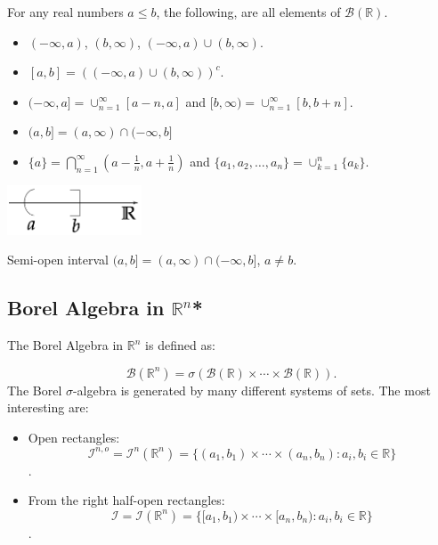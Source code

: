 \documentclass{tufte-handout}
\begin{document}
For any real numbers $a \leq b$, the following, are all elements of 
$\mathcal B(\mathbb R)$.
\begin{itemize}
\item $(-\infty, a)$, $(b, \infty)$, $ (-\infty, a) \cup (b, \infty)$.
\item $[a,b] = ( (-\infty, a) \cup (b, \infty))^c$.
\item $(-\infty, a] = \cup_{n=1}^{\infty} [a-n,a] $ and $[b, \infty) = \cup_{n=1}^{\infty} [b,b + n]$.
\item $(a,b] = (a,\infty) \cap (-\infty, b] $
\item $\{a\} = \bigcap_{n=1}^{\infty} (a-\frac{1}{n},a+\frac{1}{n}) $ and $\{a_1,a_2,\dots,a_n\} = \cup_{k=1}^n \{a_k\}$.
\end{itemize}

\begin{marginfigure}
\centering
\includegraphics[width=4cm]{fig/abb.png}
\caption{Semi-open interval $(a,b] = (a,\infty) \cap (-\infty, b]$,  $a \neq b$.
}
\end{marginfigure}

\subsection{Borel Algebra in $\mathbb R^n$*}

The Borel Algebra in $\mathbb R^n$ is defined as:

$$\mathcal B(\mathbb R^n) = \sigma( \mathcal B(\mathbb R)\times \cdots \times \mathcal B(\mathbb R) ).$$ 
The Borel $\sigma$-algebra is generated by many different systems of sets. 
The most interesting are:
\begin{itemize}
\item Open rectangles: $$\mathscr I^{n,o} =\mathscr I^n(\mathbb R^n) = \{ (a_1,b_1) \times \cdots \times (a_n,b_n): a_i,b_i\in \mathbb R\}$$.
\item From the right half-open rectangles: $$\mathscr I =\mathscr I(\mathbb R^n) = \{ [a_1,b_1) \times \cdots \times [a_n,b_n): a_i,b_i\in \mathbb R\}$$.
\end{itemize}
\end{document}
